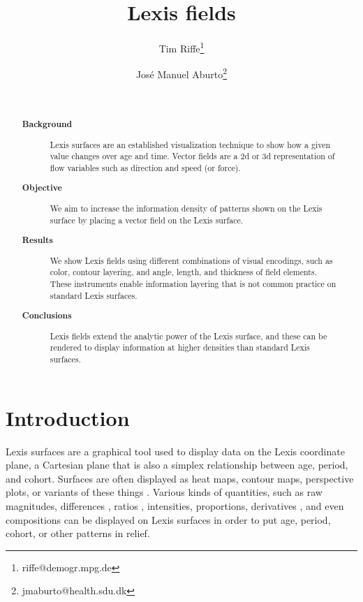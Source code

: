\documentclass{article}
\begin{document}
\title{Lexis fields}

\author[1]{Tim Riffe\thanks{riffe@demogr.mpg.de}}
\author[2]{Jos\'e Manuel Aburto\thanks{jmaburto@health.sdu.dk}}


\maketitle

\begin{abstract}
~
\begin{description}
\item[\textbf{Background}] Lexis surfaces are an established visualization
technique to show how a given value changes over age and time. Vector fields are
a 2d or 3d representation of flow variables such as direction and speed (or
force). 
\item[\textbf{Objective}] We aim to increase the information density of patterns
shown on the Lexis surface by placing a vector field on the Lexis surface. 
\item[\textbf{Results}] We show Lexis fields using different combinations of
visual encodings, such as color, contour layering, and angle, length,
and thickness of field elements. These instruments enable information layering
that is not common practice on standard Lexis surfaces.
\item[\textbf{Conclusions}] Lexis fields extend the analytic power of the Lexis
surface, and these can be rendered to display information at higher densities
than standard Lexis surfaces.
\end{description}
\end{abstract}

\onehalfspacing
\section*{Introduction}
Lexis surfaces are a graphical tool used to display data on the Lexis coordinate plane, a Cartesian plane that is also a simplex relationship between age, period, and cohort. Surfaces are often displayed as heat maps, contour maps, perspective plots, or variants of these things \citep{vaupel1987thousands}. Various kinds of quantities, such as raw magnitudes, differences \citep{minton2017visualising}, ratios \citep{canudas2005age}, intensities, proportions, derivatives \citep{rau2017visualizing}, and even compositions \citep{scholey2017visualizing} can be displayed on Lexis surfaces in order to put age, period, cohort, or other patterns in relief. 
\end{document}
